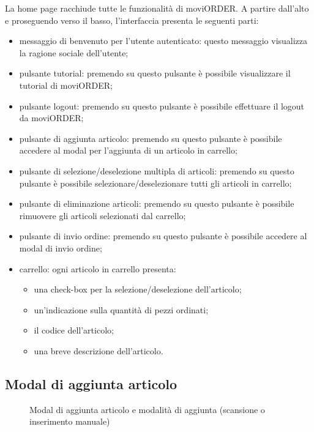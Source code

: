 La home page racchiude tutte le funzionalità di moviORDER. A partire dall'alto e proseguendo verso il basso, l'interfaccia presenta le seguenti parti:
\begin{itemize}
	\item messaggio di benvenuto per l'utente autenticato: questo messaggio visualizza la ragione sociale dell'utente;
	\item pulsante tutorial: premendo su questo pulsante è possibile visualizzare il tutorial di moviORDER;
	\item pulsante logout: premendo su questo pulsante è possibile effettuare il logout da moviORDER;
	\item pulsante di aggiunta articolo: premendo su questo pulsante è possibile accedere al modal per l'aggiunta di un articolo in carrello; 
	\item pulsante di selezione/deselezione multipla di articoli: premendo su questo pulsante è possibile selezionare/deselezionare tutti gli articoli in carrello;
	\item pulsante di eliminazione articoli: premendo su questo pulsante è possibile rimuovere gli articoli selezionati dal carrello;
	\item pulsante di invio ordine: premendo su questo pulsante è possibile accedere al modal di invio ordine;
	\item carrello: ogni articolo in carrello presenta:
	\begin{itemize}
		\item una check-box per la selezione/deselezione dell'articolo;
		\item un'indicazione sulla quantità di pezzi ordinati;
		\item il codice dell'articolo;
		\item una breve descrizione dell'articolo.
	\end{itemize}
\end{itemize}

\subsection{Modal di aggiunta articolo}

\begin{figure}[!h] 
    \centering 
    \caption{Modal di aggiunta articolo e modalità di aggiunta (scansione o inserimento manuale)}
\end{figure}

